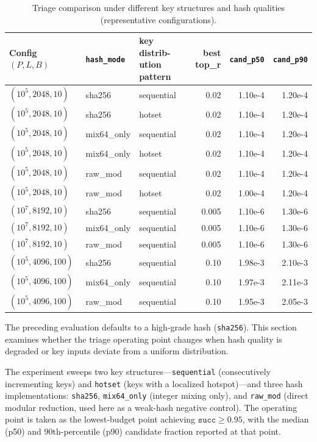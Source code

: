 \begin{table}[!thbp]
\centering
\small
\begin{tabular}{lllrrr}
\toprule
Config $(P, L, B)$ & \texttt{hash\_mode} & \shortstack[l]{key distrib-\\ution pattern} & \shortstack[l]{best \\ top\_r} & \texttt{cand\_p50} & \texttt{cand\_p90} \\
\midrule
$(10^5, 2048, 10)$ & sha256 & sequential & 0.02 & 1.10e-4 & 1.20e-4 \\
$(10^5, 2048, 10)$ & sha256 & hotset & 0.02 & 1.10e-4 & 1.20e-4 \\
$(10^5, 2048, 10)$ & mix64\_only & sequential & 0.02 & 1.10e-4 & 1.20e-4 \\
$(10^5, 2048, 10)$ & mix64\_only & hotset & 0.02 & 1.10e-4 & 1.20e-4 \\
$(10^5, 2048, 10)$ & raw\_mod & sequential & 0.02 & 1.10e-4 & 1.20e-4 \\
$(10^5, 2048, 10)$ & raw\_mod & hotset & 0.02 & 1.00e-4 & 1.20e-4 \\
$(10^7, 8192, 10)$ & sha256 & sequential & 0.005 & 1.10e-6 & 1.30e-6 \\
$(10^7, 8192, 10)$ & mix64\_only & sequential & 0.005 & 1.10e-6 & 1.30e-6 \\
$(10^7, 8192, 10)$ & raw\_mod & sequential & 0.005 & 1.10e-6 & 1.30e-6 \\
$(10^5, 4096, 100)$ & sha256 & sequential & 0.10 & 1.98e-3 & 2.10e-3 \\
$(10^5, 4096, 100)$ & mix64\_only & sequential & 0.10 & 1.97e-3 & 2.11e-3 \\
$(10^5, 4096, 100)$ & raw\_mod & sequential & 0.10 & 1.95e-3 & 2.05e-3 \\
\bottomrule
\end{tabular}
\caption{Triage comparison under different key structures and hash qualities (representative configurations).}
\label{tab:c7-a1}
\end{table}

The preceding evaluation defaults to a high-grade hash (\texttt{sha256}). This section examines whether the triage operating point changes when hash quality is degraded or key inputs deviate from a uniform distribution.

The experiment sweeps two key structures---\texttt{sequential} (consecutively incrementing keys) and \texttt{hotset} (keys with a localized hotspot)---and three hash implementations: \texttt{sha256}, \texttt{mix64\_only} (integer mixing only), and \texttt{raw\_mod} (direct modular reduction, used here as a weak-hash negative control). The operating point is taken as the lowest-budget point achieving $\texttt{succ}\ge 0.95$, with the median (p50) and 90th-percentile (p90) candidate fraction reported at that point.



